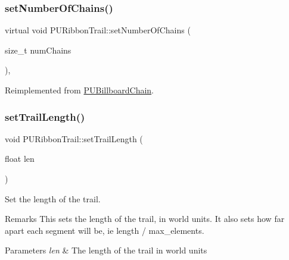 \subsubsection{\texorpdfstring{set\+Number\+Of\+Chains()}{setNumberOfChains()}\hspace{0.1cm}{\footnotesize\ttfamily [2/2]}}
{\footnotesize\ttfamily virtual void P\+U\+Ribbon\+Trail\+::set\+Number\+Of\+Chains (\begin{DoxyParamCaption}\item[{size\+\_\+t}]{num\+Chains }\end{DoxyParamCaption})\hspace{0.3cm}{\ttfamily [override]}, {\ttfamily [virtual]}}







Reimplemented from \hyperlink{classPUBillboardChain_afb09bb4c28a0475beb2c6575c7eeffa5}{P\+U\+Billboard\+Chain}.

\mbox{\label{classPURibbonTrail_a48529874c9823d5b2bd38fddd8aaeced}} 
\subsubsection{\texorpdfstring{set\+Trail\+Length()}{setTrailLength()}\hspace{0.1cm}{\footnotesize\ttfamily [1/2]}}
{\footnotesize\ttfamily void P\+U\+Ribbon\+Trail\+::set\+Trail\+Length (\begin{DoxyParamCaption}\item[{float}]{len }\end{DoxyParamCaption})\hspace{0.3cm}{\ttfamily [virtual]}}

Set the length of the trail. \begin{DoxyRemark}{Remarks}
This sets the length of the trail, in world units. It also sets how far apart each segment will be, ie length / max\+\_\+elements. 
\end{DoxyRemark}

\begin{DoxyParams}{Parameters}
{\em len} & The length of the trail in world units \\
\hline
\end{DoxyParams}
\mbox{\label{classPURibbonTrail_a59f44fbda81a2323685745dd073348f8}} 

